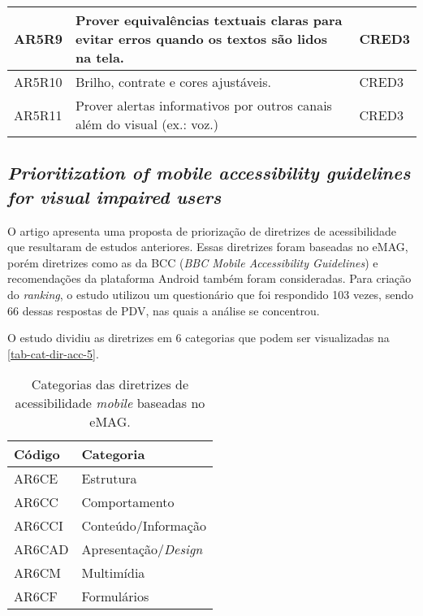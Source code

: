 \begin{table}[htb]
\begin{center}
\begin{tabular}{p{1.2cm}|p{12.1cm}|p{1.4cm}}
      \hline
      AR5R9           & Prover equivalências textuais claras para evitar erros quando os textos são lidos na tela.                        & CRED3              \\
      \hline
      AR5R10          & Brilho, contrate e cores ajustáveis.                                                                              & CRED3              \\
      \hline
      AR5R11          & Prover alertas informativos por outros canais além do visual (ex.\@: voz.)                                        & CRED3              \\
    \end{tabular}
  \end{center}
\end{table}

\subsection{\emph{Prioritization of mobile accessibility guidelines for visual impaired users}}

O artigo apresenta uma proposta de priorização de diretrizes de acessibilidade que resultaram de estudos anteriores.
Essas diretrizes foram baseadas no eMAG, porém diretrizes como as da BCC (\emph{BBC Mobile Accessibility Guidelines}) e recomendações da plataforma Android também foram consideradas.
Para criação do \emph{ranking}, o estudo utilizou um questionário que foi respondido 103 vezes, sendo 66 dessas respostas de PDV, nas quais a análise se concentrou.

O estudo dividiu as diretrizes em 6 categorias que podem ser visualizadas na \autoref{tab-cat-dir-acc-5}.

\begin{table}[htb]
  \begin{center}
    \ABNTEXfontereduzida
    \caption{Categorias das diretrizes de acessibilidade \emph{mobile} baseadas no eMAG.}
    \label{tab-cat-dir-acc-5}
    \begin{tabular}{p{1.5cm}|p{4.5cm}}
      \textbf{Código} & \textbf{Categoria}         \\
      \hline
      AR6CE           & Estrutura                  \\
      \hline
      AR6CC           & Comportamento              \\
      \hline
      AR6CCI          & Conteúdo/Informação        \\
      \hline
      AR6CAD          & Apresentação/\emph{Design} \\
      \hline
      AR6CM           & Multimídia                 \\
      \hline
      AR6CF           & Formulários                \\
    \end{tabular}
  \end{center}
\end{table}

